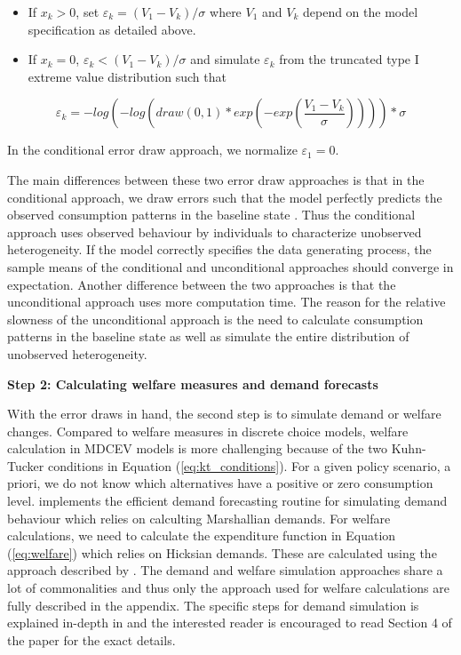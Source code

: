 \begin{itemize}
\tightlist
\item
  If \(x_k>0\), set \(\varepsilon_k = (V_1 - V_k)/ \sigma\) where
  \(V_1\) and \(V_k\) depend on the model specification as detailed
  above.
\item
  If \(x_k=0\), \(\varepsilon_k < (V_1 - V_k)/ \sigma\) and simulate
  \(\varepsilon_k\) from the truncated type I extreme value distribution
  such that
\end{itemize}

\begin{equation}
\varepsilon_k = -log(-log(draw(0, 1) * exp(-exp(\frac{V_1 - V_k}{\sigma})))) * \sigma
\end{equation}

In the conditional error draw approach, we normalize
\(\varepsilon_1=0\).

The main differences between these two error draw approaches is that in
the conditional approach, we draw errors such that the model perfectly
predicts the observed consumption patterns in the baseline state
\citep{vonhaefenkuhn-tucker2005}. Thus the conditional approach uses
observed behaviour by individuals to characterize unobserved
heterogeneity. If the model correctly specifies the data generating
process, the sample means of the conditional and unconditional
approaches should converge in expectation. Another difference between
the two approaches is that the unconditional approach uses more
computation time. The reason for the relative slowness of the
unconditional approach is the need to calculate consumption patterns in
the baseline state as well as simulate the entire distribution of
unobserved heterogeneity.

\textbf{Step 2: Calculating welfare measures and demand forecasts}

With the error draws in hand, the second step is to simulate demand or
welfare changes. Compared to welfare measures in discrete choice models,
welfare calculation in MDCEV models is more challenging because of the
two Kuhn-Tucker conditions in Equation (\ref{eq:kt_conditions}). For a
given policy scenario, a priori, we do not know which alternatives have
a positive or zero consumption level.  implements the
\citet{pinjaricomputationally2011} efficient demand forecasting routine
for simulating demand behaviour which relies on calculting Marshallian
demands. For welfare calculations, we need to calculate the expenditure
function in Equation (\ref{eq:welfare}) which relies on Hicksian
demands. These are calculated using the approach described by
\citet{lloydsmithnew2018}. The demand and welfare simulation approaches
share a lot of commonalities and thus only the approach used for welfare
calculations are fully described in the appendix. The specific steps for
demand simulation is explained in-depth in
\citet{pinjaricomputationally2011} and the interested reader is
encouraged to read Section 4 of the paper for the exact details.

